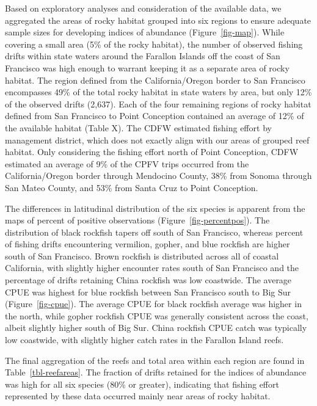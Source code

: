 \documentclass[
  12pt,
  authoryear,
  preprint,
  3p]{elsarticle}
\begin{document}
Based on exploratory analyses and consideration of the available data,
we aggregated the areas of rocky habitat grouped into six regions to
ensure adequate sample sizes for developing indices of abundance
(Figure~\ref{fig-map}). While covering a small area (5\% of the rocky
habitat), the number of observed fishing drifts within state waters
around the Farallon Islands off the coast of San Francisco was high
enough to warrant keeping it as a separate area of rocky habitat. The
region defined from the California/Oregon border to San Francisco
encompasses 49\% of the total rocky habitat in state waters by area, but
only 12\% of the observed drifts (2,637). Each of the four remaining
regions of rocky habitat defined from San Francisco to Point Conception
contained an average of 12\% of the available habitat (Table X). The
CDFW estimated fishing effort by management district, which does not
exactly align with our areas of grouped reef habitat. Only considering
the fishing effort north of Point Conception, CDFW estimated an average
of 9\% of the CPFV trips occurred from the California/Oregon border
through Mendocino County, 38\% from Sonoma through San Mateo County, and
53\% from Santa Cruz to Point Conception.

The differences in latitudinal distribution of the six species is
apparent from the maps of percent of positive observations
(Figure~\ref{fig-percentpos}). The distribution of black rockfish tapers
off south of San Francisco, whereas percent of fishing drifts
encountering vermilion, gopher, and blue rockfish are higher south of
San Francisco. Brown rockfish is distributed across all of coastal
California, with slightly higher encounter rates south of San Francisco
and the percentage of drifts retaining China rockfish was low coastwide.
The average CPUE was highest for blue rockfish between San Francisco
south to Big Sur (Figure~\ref{fig-cpue}). The average CPUE for black
rockfish average was higher in the north, while gopher rockfish CPUE was
generally consistent across the coast, albeit slightly higher south of
Big Sur. China rockfish CPUE catch was typically low coastwide, with
slightly higher catch rates in the Farallon Island reefs.

The final aggregation of the reefs and total area within each region are
found in Table~\ref{tbl-reefareas}. The fraction of drifts retained for
the indices of abundance was high for all six species (80\% or greater),
indicating that fishing effort represented by these data occurred mainly
near areas of rocky habitat.
\end{document}
